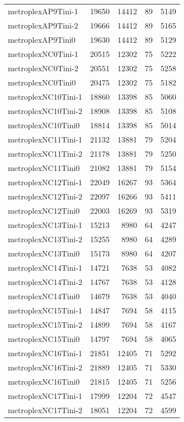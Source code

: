\begin{tabular}{lrrrr}
metroplexAP9Tini-1 & 19650 & 14412 & 89 & 5149 \\
metroplexAP9Tini-2 & 19666 & 14412 & 89 & 5165 \\
metroplexAP9Tini0 & 19630 & 14412 & 89 & 5129 \\
metroplexNC0Tini-1 & 20515 & 12302 & 75 & 5222 \\
metroplexNC0Tini-2 & 20551 & 12302 & 75 & 5258 \\
metroplexNC0Tini0 & 20475 & 12302 & 75 & 5182 \\
metroplexNC10Tini-1 & 18860 & 13398 & 85 & 5060 \\
metroplexNC10Tini-2 & 18908 & 13398 & 85 & 5108 \\
metroplexNC10Tini0 & 18814 & 13398 & 85 & 5014 \\
metroplexNC11Tini-1 & 21132 & 13881 & 79 & 5204 \\
metroplexNC11Tini-2 & 21178 & 13881 & 79 & 5250 \\
metroplexNC11Tini0 & 21082 & 13881 & 79 & 5154 \\
metroplexNC12Tini-1 & 22049 & 16267 & 93 & 5364 \\
metroplexNC12Tini-2 & 22097 & 16266 & 93 & 5411 \\
metroplexNC12Tini0 & 22003 & 16269 & 93 & 5319 \\
metroplexNC13Tini-1 & 15213 & 8980 & 64 & 4247 \\
metroplexNC13Tini-2 & 15255 & 8980 & 64 & 4289 \\
metroplexNC13Tini0 & 15173 & 8980 & 64 & 4207 \\
metroplexNC14Tini-1 & 14721 & 7638 & 53 & 4082 \\
metroplexNC14Tini-2 & 14767 & 7638 & 53 & 4128 \\
metroplexNC14Tini0 & 14679 & 7638 & 53 & 4040 \\
metroplexNC15Tini-1 & 14847 & 7694 & 58 & 4115 \\
metroplexNC15Tini-2 & 14899 & 7694 & 58 & 4167 \\
metroplexNC15Tini0 & 14797 & 7694 & 58 & 4065 \\
metroplexNC16Tini-1 & 21851 & 12405 & 71 & 5292 \\
metroplexNC16Tini-2 & 21889 & 12405 & 71 & 5330 \\
metroplexNC16Tini0 & 21815 & 12405 & 71 & 5256 \\
metroplexNC17Tini-1 & 17999 & 12204 & 72 & 4547 \\
metroplexNC17Tini-2 & 18051 & 12204 & 72 & 4599 \\

\end{tabular}
